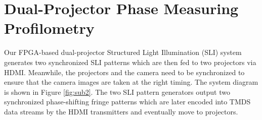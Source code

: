 \documentclass[]{spie}  %
\begin{document}
\section{Dual-Projector Phase Measuring Profilometry}
Our FPGA-based dual-projector Structured Light Illumination (SLI) system generates two synchronized SLI patterns which are then fed to two projectors via HDMI. Meanwhile, the projectors and the camera need to be synchronized to ensure that the camera images are taken at the right timing. The system diagram is shown in Figure \ref{fig:sub2}. The two SLI pattern generators output two synchronized phase-shifting fringe patterns which are later encoded into TMDS data streams by the HDMI transmitters and eventually move to projectors. 

\end{document}
